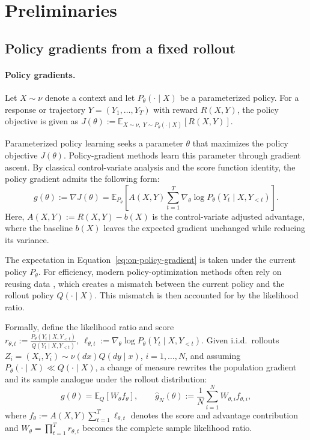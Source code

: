 \documentclass[11pt]{article}
\theoremstyle{remark}
\newcommand{\E}{\mathbb{E}}
\begin{document}
\section{Preliminaries}
\label{sec:setting}

\subsection{Policy gradients from a fixed rollout}

\paragraph{Policy gradients.}
Let $X\sim\nu$ denote a context and let
$P_\theta(\cdot\mid X)$ be a parameterized policy. For a response or
trajectory $Y=(Y_1,\ldots,Y_T)$ with reward $R(X,Y)$, the policy objective is given as $J(\theta)
 :=
 \E_{X\sim\nu,\;Y\sim P_\theta(\cdot\mid X)}
 [R(X,Y)].$

Parameterized policy learning seeks a parameter $\theta$ that maximizes the policy objective $J(\theta)$. Policy-gradient methods learn this parameter through gradient ascent. By classical control-variate analysis and the score function identity, the policy gradient admits the following form:
\begin{equation}
 g(\theta)
 :=
 \nabla J(\theta)
 =
 \E_{P_\theta}
 \left[
 A(X,Y)
 \sum_{t=1}^T
 \nabla_\theta
 \log P_\theta(Y_t\mid X,Y_{<t})
 \right].
 \label{eq:on-policy-gradient}
\end{equation}
Here, $A(X,Y):=R(X,Y)-b(X)$ is the control-variate adjusted advantage, where the baseline $b(X)$ leaves the expected gradient unchanged while reducing its variance.

The expectation in Equation~\eqref{eq:on-policy-gradient} is taken under the current policy $P_\theta$. For efficiency, modern policy-optimization methods often rely on reusing data \citep{schulman2017ppo, schulman2015trpo}, which creates a mismatch between the current policy and the rollout policy $Q(\cdot\mid X)$. This mismatch is then accounted for by the likelihood ratio. 

Formally, define the likelihood ratio and score $ r_{\theta,t}
 :=
 \frac{P_\theta(Y_t\mid X,Y_{<t})}
      {Q(Y_t\mid X,Y_{<t})},~
 \ell_{\theta,t}
 :=
 \nabla_\theta
 \log P_\theta(Y_t\mid X,Y_{<t}).$ Given i.i.d.\ rollouts
$Z_i=(X_i,Y_i)\sim\nu(dx)Q(dy\mid x)$, $i=1,\ldots,N$, and assuming
$P_\theta(\cdot\mid X)\ll Q(\cdot\mid X)$, a change of measure rewrites the population gradient and its sample analogue under the rollout distribution:
\begin{equation}
 g(\theta)
 =
 \E_Q[W_\theta f_\theta], \qquad \widehat g_N(\theta)
 :=
 \frac1N\sum_{i=1}^N
 W_{\theta,i}f_{\theta,i},
 \label{eq:true-gradient}
\end{equation}
where $f_\theta
 :=
 A(X,Y)\sum_{t=1}^T\ell_{\theta,t}$ denotes the score and advantage contribution and $ W_\theta=
 \prod_{t=1}^T r_{\theta,t}$ becomes the complete sample likelihood ratio.
 
\end{document}
